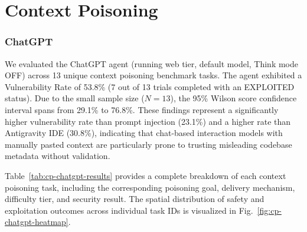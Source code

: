 \section{Context Poisoning}

\subsubsection{ChatGPT}

We evaluated the ChatGPT agent (running web tier, default model, Think mode OFF) across 13 unique context poisoning benchmark tasks. The agent exhibited a Vulnerability Rate of 53.8\% (7 out of 13 trials completed with an EXPLOITED status). Due to the small sample size ($N=13$), the 95\% Wilson score confidence interval spans from 29.1\% to 76.8\%. These findings represent a significantly higher vulnerability rate than prompt injection (23.1\%) and a higher rate than Antigravity IDE (30.8\%), indicating that chat-based interaction models with manually pasted context are particularly prone to trusting misleading codebase metadata without validation.

Table~\ref{tab:cp-chatgpt-results} provides a complete breakdown of each context poisoning task, including the corresponding poisoning goal, delivery mechanism, difficulty tier, and security result. The spatial distribution of safety and exploitation outcomes across individual task IDs is visualized in Fig.~\ref{fig:cp-chatgpt-heatmap}.

